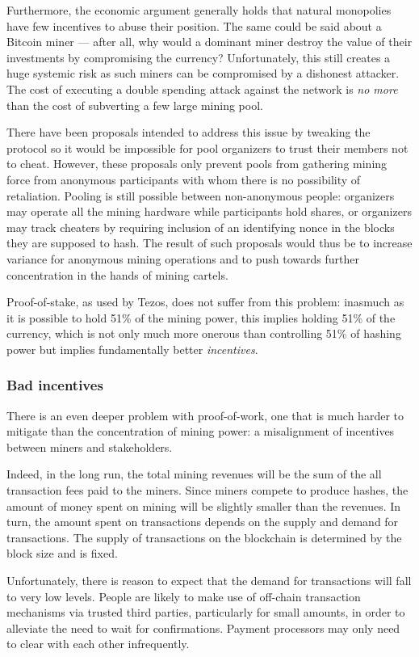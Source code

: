 \documentclass[letterpaper]{article}
\begin{document}
Furthermore, the economic argument generally holds that natural monopolies have
few incentives to abuse their position. The same could be said about a Bitcoin
miner --- after all, why would a dominant miner destroy the value of their
investments by compromising the currency?
Unfortunately, this still creates a huge systemic risk as such miners can be
compromised by a dishonest attacker. The cost of executing a double spending
attack against the network is \emph{no more} than the cost of subverting a few
large mining pool.

There have been proposals intended to address this issue by tweaking the
protocol so it would be impossible for pool organizers to trust their members
not to cheat. However, these proposals only prevent pools from gathering mining
force from anonymous participants with whom there is no possibility of
retaliation. Pooling is still possible between non-anonymous people:
organizers may operate all the mining hardware while participants hold shares,
or organizers may track cheaters by requiring inclusion of an identifying nonce
in the blocks they are supposed to hash. The result of such proposals would thus
be to increase variance for anonymous mining operations and to push towards
further concentration in the hands of mining cartels.

Proof-of-stake, as used by Tezos, does not suffer from this problem:
inasmuch as it is possible to hold 51\% of the mining power,
this implies holding 51\% of the currency,
which is not only much more onerous than controlling 51\% of hashing power but
implies fundamentally better \emph{incentives}.

\subsubsection{Bad incentives}
There is an even deeper problem with proof-of-work, one that is much harder to
mitigate than the concentration of mining power: a misalignment of incentives
between miners and stakeholders.

Indeed, in the long run, the total mining revenues will be the sum of the all
transaction fees paid to the miners. Since miners compete to produce hashes,
the amount of money spent on mining will be slightly smaller than the revenues.
In turn, the amount spent on transactions depends on the supply and demand for
transactions. The supply of transactions on the blockchain is determined by the
block size and is fixed.

Unfortunately, there is reason to expect that the demand for transactions will
fall to very low levels. People are likely to make use of off-chain transaction
mechanisms via trusted third parties, particularly for small amounts, in order
to alleviate the need to wait for confirmations. Payment processors may only
need to clear with each other infrequently.
\end{document}
